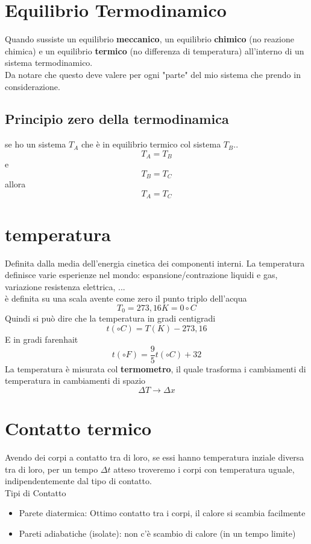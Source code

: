 \documentclass[a4paper]{report}
\begin{document}
  \section{Equilibrio Termodinamico}
  Quando sussiste un equilibrio \textbf{meccanico}, un equilibrio \textbf{chimico} (no reazione chimica) e un equilibrio \textbf{termico} (no differenza di temperatura) all'interno di un sistema termodinamico.\\
  Da notare che questo deve valere per ogni "parte" del mio sistema che prendo in considerazione.
  \subsection{Principio zero della termodinamica}
  se ho un sistema $T_A$ che è in equilibrio termico col sistema $T_B$..
  $$T_A = T_B$$
  e $$T_B = T_C$$
  allora $$T_A = T_C$$


  \section{temperatura}
  Definita dalla media dell'energia cinetica dei componenti interni. La temperatura definisce varie esperienze nel mondo: espansione/contrazione liquidi e gas, variazione resistenza elettrica, ...\\
  è definita su una scala avente come zero il punto triplo dell'acqua
  $$T_0 = 273,16 K = 0 \circ C$$
  Quindi si può dire che la temperatura in gradi centigradi
  $$ t(\circ C) = T(K) - 273,16$$
  E in gradi farenhait
  $$ t(\circ F) = \frac{9}{5} t(\circ C) + 32$$
  La temperatura è misurata col \textbf{termometro}, il quale trasforma i cambiamenti di temperatura in cambiamenti di spazio
  $$\Delta T \rightarrow \Delta x$$


  \section{Contatto termico}
  Avendo dei corpi a contatto tra di loro, se essi hanno temperatura inziale diversa tra di loro, per un tempo $\Delta t$ atteso troveremo i corpi con temperatura uguale, indipendentemente dal tipo di contatto.\\
  Tipi di Contatto
  \begin{itemize}
    \item Parete diatermica: Ottimo contatto tra i corpi, il calore si scambia facilmente
    \item Pareti adiabatiche (isolate): non c'è scambio di calore (in un tempo limite)
  \end{itemize}
\end{document}
